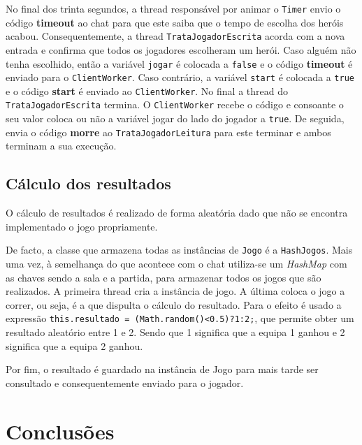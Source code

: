 \documentclass[a4paper]{article}
\begin{document}
No final dos trinta segundos, a thread responsável por animar o \texttt{Timer} envio o código \textbf{timeout} ao chat para que este saiba que o tempo de escolha dos heróis acabou. Consequentemente, a thread \texttt{TrataJogadorEscrita} acorda com a nova entrada e confirma que todos os jogadores escolheram um herói. Caso alguém não tenha escolhido, então a variável \texttt{jogar} é colocada a \texttt{false} e o código \textbf{timeout} é enviado para o \texttt{ClientWorker}. Caso contrário, a variável \texttt{start} é colocada a \texttt{true} e o código \textbf{start} é enviado ao \texttt{ClientWorker}. No final a thread do \texttt{TrataJogadorEscrita} termina. O \texttt{ClientWorker} recebe o código e consoante o seu valor coloca ou não a variável jogar do lado do jogador a \texttt{true}. De seguida, envia o código \textbf{morre} ao \texttt{TrataJogadorLeitura} para este terminar e ambos terminam a sua execução.


\subsection{Cálculo dos resultados}

\hspace{3mm} O cálculo de resultados é realizado de forma aleatória dado que não se encontra implementado o jogo propriamente.

De facto, a classe que armazena todas as instâncias de \texttt{Jogo} é a \texttt{HashJogos}. Mais uma vez, à semelhança do que acontece com o chat utiliza-se um \textit{HashMap} com as chaves sendo a sala e a partida, para armazenar todos os jogos que são realizados. A primeira thread cria a instância de jogo. A última coloca o jogo a correr, ou seja, é a que dispulta o cálculo do resultado. Para o efeito é usado a expressão \texttt{this.resultado = (Math.random()<0.5)?1:2;}, que permite obter um resultado aleatório entre 1 e 2. Sendo que 1 significa que a equipa 1 ganhou e 2 significa que a equipa 2 ganhou. 

Por fim, o resultado é guardado na instância de Jogo para mais tarde ser consultado e consequentemente enviado para o jogador.

\pagebreak


\section{Conclusões}
\label{sec:4}

\hspace{3mm} 
\end{document}
